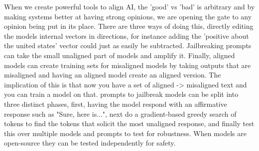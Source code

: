 When we create powerful tools to align AI, the 'good' vs 'bad' is arbitrary and by making systems better at having strong opinions, we are opening the gate to any opinion being put in its place. There are three ways of doing this, directly editing the models internal vectors in directions, for instance adding the 'positive about the united states' vector could just as easily be subtracted. Jailbreaking prompts can take the small unaligned part of models and amplify it. Finally, aligned models can create training sets for misaligned models by taking outputs that are misaligned and having an aligned model create an aligned version. The implication of this is that now you have a set of aligned -> misaligned text and you can train a model on that.
\citep{west_ai_2024}
\citep{zou_universal_2023}
prompts to jailbreak models can be split into three distinct phases, first, having the model respond with an affirmative response such as "Sure, here is...", next do a gradient-based greedy search of tokens to find the tokens that solicit the most unaligned response, and finally test this over multiple models and prompts to test for robustness.
When models are open-source they can be tested independently for safety.

